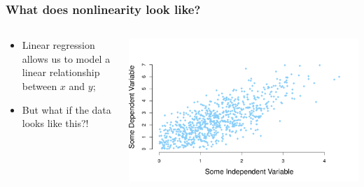\documentclass[aspectratio=169]{beamer}
\theoremstyle{principle}
\begin{document}
\begin{frame}
\frametitle{What does nonlinearity look like?}

\begin{columns}
\begin{column}{0.4\textwidth}

\begin{itemize}
\item Linear regression allows us to model a linear relationship between $x$ and $y$;
\bigskip
\bigskip
\bigskip

\item[]\color{white} But what if the data looks like this?!

\end{itemize}

\end{column}
\begin{column}{0.6\textwidth}
\begin{center}
\includegraphics[scale=0.45]{point_cloud.pdf}
\end{center}
\end{column}
\end{columns}

\end{frame}
\end{document}
